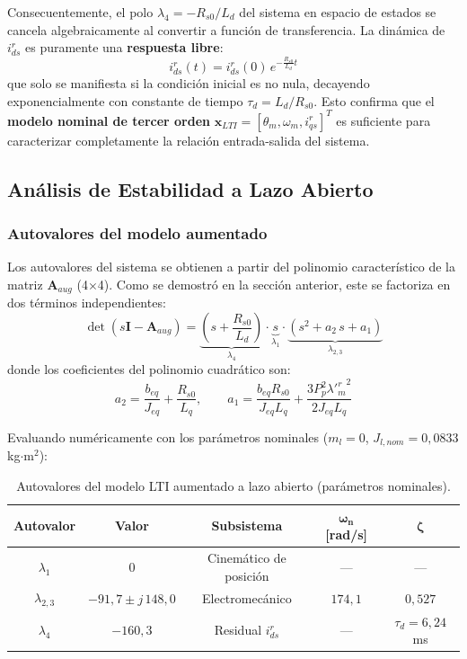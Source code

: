 \documentclass[12pt, a4paper,journal, onecolumn, compsoc]{IEEEtran}
\begin{document}
Consecuentemente, el polo $\lambda_4 = -R_{s0}/L_d$ del sistema en espacio de estados se cancela algebraicamente al convertir a función de transferencia. La dinámica de $i_{ds}^r$ es puramente una \textbf{respuesta libre}:
\begin{equation}
    i_{ds}^r(t) = i_{ds}^r(0) \, e^{-\frac{R_{s0}}{L_d} t}
\end{equation}
que solo se manifiesta si la condición inicial es no nula, decayendo exponencialmente con constante de tiempo $\tau_d = L_d / R_{s0}$. Esto confirma que el \textbf{modelo nominal de tercer orden} $\mathbf{x}_{LTI} = [\theta_m, \omega_m, i_{qs}^r]^T$ es suficiente para caracterizar completamente la relación entrada-salida del sistema.

\subsection{Análisis de Estabilidad a Lazo Abierto}

\subsubsection{Autovalores del modelo aumentado}
Los autovalores del sistema se obtienen a partir del polinomio característico de la matriz $\mathbf{A}_{aug}$ (4$\times$4). Como se demostró en la sección anterior, este se factoriza en dos términos independientes:
\begin{equation}
    \det(s\mathbf{I} - \mathbf{A}_{aug}) = \underbrace{\left(s + \frac{R_{s0}}{L_d}\right)}_{\lambda_4} \cdot \underbrace{s}_{\lambda_1} \cdot \underbrace{\left(s^2 + a_2\,s + a_1\right)}_{\lambda_{2,3}}
\end{equation}
donde los coeficientes del polinomio cuadrático son:
\begin{equation}
    a_2 = \frac{b_{eq}}{J_{eq}} + \frac{R_{s0}}{L_q}, \qquad a_1 = \frac{b_{eq} R_{s0}}{J_{eq} L_q} + \frac{3 P_p^2 {\lambda'^r_m}^2}{2 J_{eq} L_q}
\end{equation}

Evaluando numéricamente con los parámetros nominales ($m_l = 0$, $J_{l,nom} = 0{,}0833$ kg$\cdot$m$^2$):

\begin{table}[H]
\centering
\caption{Autovalores del modelo LTI aumentado a lazo abierto (parámetros nominales).}
\label{tab:autovalores_LA}
\renewcommand{\arraystretch}{1.4}
\begin{tabular}{|c|c|c|c|c|}
\hline
\textbf{Autovalor} & \textbf{Valor} & \textbf{Subsistema} & $\boldsymbol{\omega_n}$ \textbf{[rad/s]} & $\boldsymbol{\zeta}$ \\
\hline
$\lambda_1$ & $0$ & Cinemático de posición & --- & --- \\
\hline
$\lambda_{2,3}$ & $-91{,}7 \pm j\,148{,}0$ & Electromecánico & $174{,}1$ & $0{,}527$ \\
\hline
$\lambda_4$ & $-160{,}3$ & Residual $i_{ds}^r$ & --- & $\tau_d = 6{,}24$ ms \\
\hline
\end{tabular}
\end{table}
\end{document}
